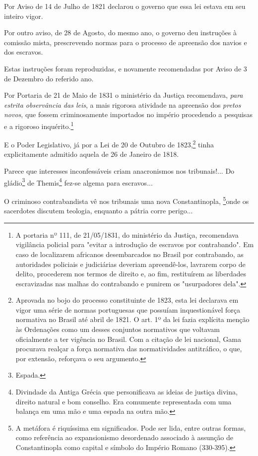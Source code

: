 Por Aviso de 14 de Julho de 1821 declarou o governo que essa lei estava
em seu inteiro vigor.

Por outro aviso, de 28 de Agosto, do mesmo ano, o governo deu instruções
à comissão mista, prescrevendo normas para o processo de apreensão dos
navios e dos escravos.

Estas instruções foram reproduzidas, e novamente recomendadas por Aviso
de 3 de Dezembro do referido ano.

Por Portaria de 21 de Maio de 1831 o ministério da Justiça recomendava,
\emph{para estrita observância das leis}, a mais rigorosa atividade na
apreensão dos \emph{pretos novos}, que fossem criminosamente importados
no império procedendo a pesquisas e a rigoroso inquérito.\footnote{A
  portaria nº 111, de 21/05/1831, do ministério da Justiça, recomendava
  vigilância policial para "evitar a introdução de escravos por
  contrabando". Em caso de localizarem africanos desembarcados no Brasil
  por contrabando, as autoridades policiais e judiciárias deveriam
  apreendê-los, lavrarem corpo de delito, procederem nos termos de
  direito e, ao fim, restituírem as liberdades escravizadas nas malhas
  do contrabando e punirem os "usurpadores dela".}

E o Poder Legislativo, já por a Lei de 20 de Outubro de 1823,\footnote{
  Aprovada no bojo do processo constituinte de 1823, esta lei declarava
  em vigor uma série de normas portuguesas que possuíam inquestionável
  força normativa no Brasil até abril de 1821. O art. 1º da lei fazia
  explícita menção às Ordenações como um desses conjuntos normativos que
  voltavam oficialmente a ter vigência no Brasil. Com a citação de lei
  nacional, Gama procurava realçar a força normativa das normatividades
  antitráfico, o que, por extensão, reforçava o seu argumento.} tinha
explicitamente admitido aquela de 26 de Janeiro de 1818.

Parece que interesses inconfessáveis criam anacronismos nos
tribunais!... Do gládio\footnote{Espada.} de Themis\footnote{
  Divindade da Antiga Grécia que personificava as ideias de justiça
  divina, direito natural e bom conselho. Era comumente representada com
  uma balança em uma mão e uma espada na outra mão.} fez-se algema para
escravos...

O criminoso contrabandista vê nos tribunais uma nova Constantinopla,
\footnote{A metáfora é riquíssima em significados. Pode ser lida,
  entre outras formas, como referência ao expansionismo desordenado
  associado à assunção de Constantinopla como capital e símbolo do
  Império Romano (330-395).}onde os sacerdotes discutem teologia,
enquanto a pátria corre perigo...

